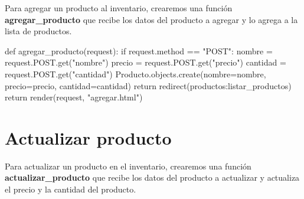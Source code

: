 \documentclass[
  a4paper,
  DIV=11,
  numbers=noendperiod,
  onepage,
  openany]{scrreprt}
\newenvironment{Shaded}{\begin{snugshade}}{\end{snugshade}}
\newcommand{\ControlFlowTok}[1]{\textcolor[rgb]{0.00,0.23,0.31}{#1}}
\newcommand{\KeywordTok}[1]{\textcolor[rgb]{0.00,0.23,0.31}{#1}}
\newcommand{\NormalTok}[1]{\textcolor[rgb]{0.00,0.23,0.31}{#1}}
\newcommand{\OperatorTok}[1]{\textcolor[rgb]{0.37,0.37,0.37}{#1}}
\newcommand{\StringTok}[1]{\textcolor[rgb]{0.13,0.47,0.30}{#1}}
\begin{document}
Para agregar un producto al inventario, crearemos una función
\textbf{agregar\_producto} que recibe los datos del producto a agregar y
lo agrega a la lista de productos.

\begin{Shaded}
\begin{Highlighting}[]
\KeywordTok{def}\NormalTok{ agregar\_producto(request):}
    \ControlFlowTok{if}\NormalTok{ request.method }\OperatorTok{==} \StringTok{"POST"}\NormalTok{:}
\NormalTok{        nombre }\OperatorTok{=}\NormalTok{ request.POST.get(}\StringTok{"nombre"}\NormalTok{)}
\NormalTok{        precio }\OperatorTok{=}\NormalTok{ request.POST.get(}\StringTok{"precio"}\NormalTok{)}
\NormalTok{        cantidad }\OperatorTok{=}\NormalTok{ request.POST.get(}\StringTok{"cantidad"}\NormalTok{)}
\NormalTok{        Producto.objects.create(nombre}\OperatorTok{=}\NormalTok{nombre, precio}\OperatorTok{=}\NormalTok{precio, cantidad}\OperatorTok{=}\NormalTok{cantidad) }
        \ControlFlowTok{return}\NormalTok{ redirect(}\StringTok{\textquotesingle{}productos:listar\_productos\textquotesingle{}}\NormalTok{)}
    \ControlFlowTok{return}\NormalTok{ render(request, }\StringTok{"agregar.html"}\NormalTok{)}
\end{Highlighting}
\end{Shaded}

\section{Actualizar producto}\label{actualizar-producto}

Para actualizar un producto en el inventario, crearemos una función
\textbf{actualizar\_producto} que recibe los datos del producto a
actualizar y actualiza el precio y la cantidad del producto.
\end{document}
